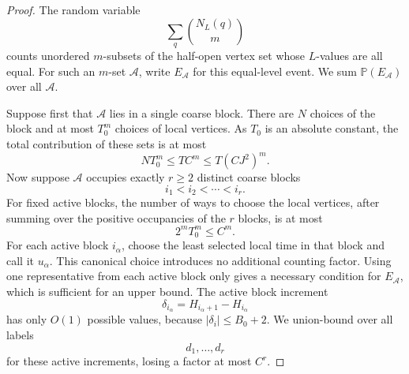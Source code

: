 \documentclass[10pt,a4paper]{amsart}
\newcommand{\Pp}{\mathbb P}
\newcommand{\1}{\mathbf 1}
\begin{document}
\begin{proof}
The random variable
\[
\sum_q\binom{N_L(q)}{m}
\]
counts unordered $m$-subsets of the half-open vertex set whose $L$-values are all equal.  For such an $m$-set $\mathcal A$, write $E_\mathcal A$ for this equal-level event.  We sum $\Pp(E_\mathcal A)$ over all $\mathcal A$.

\bigskip
\noindent
Suppose first that $\mathcal A$ lies in a single coarse block.  There are $N$ choices of the block and at most $T_0^m$ choices of local vertices.  As $T_0$ is an absolute constant, the total contribution of these sets is at most
\[
NT_0^m\le T C^m\le T(CJ^2)^m.
\]
Now suppose $\mathcal A$ occupies exactly $r\ge2$ distinct coarse blocks
\[
i_1<i_2<\cdots<i_r.
\]
For fixed active blocks, the number of ways to choose the local vertices, after summing over the positive occupancies of the $r$ blocks, is at most
\[
2^mT_0^m\le C^m.
\]
For each active block $i_\alpha$, choose the least selected local time in that block and call it $u_\alpha$.  This canonical choice introduces no additional counting factor.  Using one representative from each active block only gives a necessary condition for $E_\mathcal A$, which is sufficient for an upper bound.  The active block increment
\[
\delta_{i_\alpha}=H_{i_\alpha+1}-H_{i_\alpha}
\]
has only $O(1)$ possible values, because $|\delta_i|\le B_0+2$.  We union-bound over all labels
\[
d_1,\ldots,d_r
\]
for these active increments, losing a factor at most $C^r$.


\end{proof}
\end{document}

